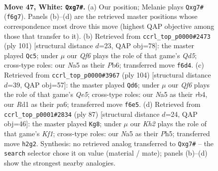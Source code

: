 \documentclass[11pt]{article}
\begin{document}
\clearpage

\begin{figure}[p]\centering
\begin{subfigure}{0.46\textwidth}\centering
\resizebox{\linewidth}{!}{%
\newchessgame
\chessboard[
  setfen={7k/6rp/5Q1P/Np6/6P1/8/PP5K/3R4 w - - 3 47},
  showmover=false,
  pgfstyle=straightmove, color=movearrow, markmove={f6-g7}
]}
\caption{}
\end{subfigure}\hfill
\begin{subfigure}{0.46\textwidth}\centering
\resizebox{\linewidth}{!}{%
\newchessgame
\chessboard[
  setfen={8/6k1/1p2p3/8/P1pq4/4R1P1/2R2K1P/8 b - - 1 51},
  showmover=false,
  pgfstyle=straightmove, color=movearrow, markmove={d4-c5}
]}
\caption{}
\end{subfigure}
\\[4pt]
\begin{subfigure}{0.46\textwidth}\centering
\resizebox{\linewidth}{!}{%
\newchessgame
\chessboard[
  setfen={1k6/2r4p/p7/4Q3/1rP5/6PK/P6P/8 w - - 1 53},
  showmover=false,
  pgfstyle=straightmove, color=movearrow, markmove={e5-d6}
]}
\caption{}
\end{subfigure}\hfill
\begin{subfigure}{0.46\textwidth}\centering
\resizebox{\linewidth}{!}{%
\newchessgame
\chessboard[
  setfen={5k2/R7/6p1/7p/p3qP1P/5R2/5PK1/8 b - - 8 44},
  showmover=false,
  pgfstyle=straightmove, color=movearrow, markmove={f8-g8}
]}
\caption{}
\end{subfigure}
\caption{\textbf{Move 47, White: \texttt{Qxg7\#}.} (a) Our position; Melanie plays \texttt{Qxg7\#} (\texttt{f6g7}). Panels (b)--(d) are the retrieved master positions whose correspondence most drove this move (highest QAP objective among those that transfer to it). (b) Retrieved from \texttt{ccrl\_top\_p0000\#2473} (ply 101) [structural distance $d$=23, QAP obj=78]: the master played \texttt{Qc5}; under $\mu$ our \emph{Qf6} plays the role of that game's \emph{Qd5}; cross-type roles: our \emph{N}a5 as their \emph{P}b6; transferred move \texttt{f6d4}. (c) Retrieved from \texttt{ccrl\_top\_p0000\#3967} (ply 104) [structural distance $d$=39, QAP obj=57]: the master played \texttt{Qd6}; under $\mu$ our \emph{Qf6} plays the role of that game's \emph{Qe5}; cross-type roles: our \emph{N}a5 as their \emph{r}b4, our \emph{R}d1 as their \emph{p}a6; transferred move \texttt{f6e5}. (d) Retrieved from \texttt{ccrl\_top\_p0001\#2834} (ply 87) [structural distance $d$=24, QAP obj=46]: the master played \texttt{Kg8}; under $\mu$ our \emph{Kh2} plays the role of that game's \emph{Kf1}; cross-type roles: our \emph{N}a5 as their \emph{P}h5; transferred move \texttt{h2g2}. Synthesis: no retrieved analog transferred to \texttt{Qxg7\#} -- the \texttt{search} selector chose it on value (material / mate); panels (b)--(d) show the strongest nearby analogies.}
\label{fig:thought-m92}
\end{figure}
\end{document}
